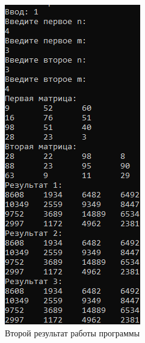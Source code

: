 \documentclass[14pt, a4paper]{extarticle}
\begin{document}
\begin{figure}[h!]
	\centering
	\includegraphics[scale=1]{source/Example2.png}
	\caption{Второй результат работы программы}
	\label{Example2}
\end{figure}\par
\clearpage
\end{document}
